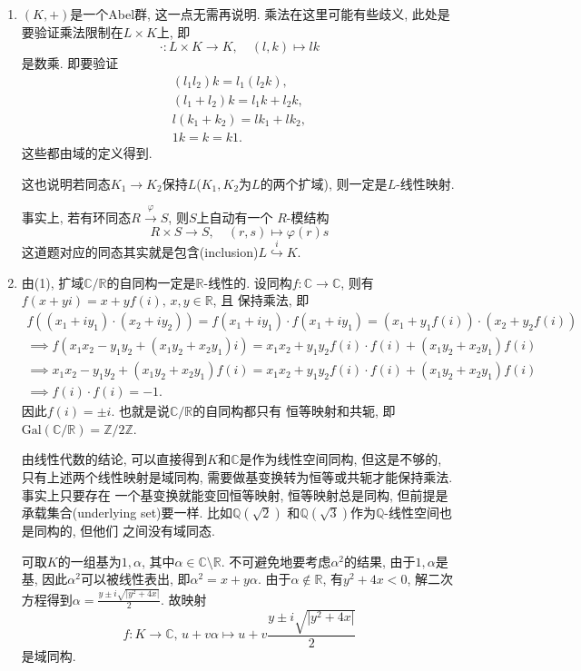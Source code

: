 \begin{solution}
\begin{enumerate}[(1)]
    \item $(K, +)$是一个Abel群, 这一点无需再说明. 乘法在这里可能有些歧义,
    此处是要验证乘法限制在$L \times K$上, 即
    \[
        \cdot: L \times K \to K, \quad (l, k) \mapsto lk
    \]
    是数乘. 即要验证
    \[
    \begin{gathered}
        (l_1l_2)k = l_1(l_2k),\\
        (l_1 + l_2)k = l_1k + l_2k,\\
        l(k_1 + k_2) = lk_1 + lk_2,\\
        1k = k = k1.
    \end{gathered}
    \]
    这些都由域的定义得到.

    这也说明若同态$K_1 \to K_2$保持$L$($K_1, K_2$为$L$的两个扩域),
    则一定是$L$-线性映射.

    事实上, 若有环同态$R \overset{\varphi}\to S$, 则$S$上自动有一个
    $R$-模结构
    \[
        R \times S \to S, \quad (r, s) \mapsto \varphi(r)s
    \]
    这道题对应的同态其实就是包含(inclusion)$L \overset{i}\hookrightarrow K$.
    \item 由(1), 扩域$\mathbb{C}/\mathbb{R}$的自同构一定是$\mathbb{R}$-线性的.
    设同构$f: \mathbb{C} \to \mathbb{C}$, 则有
    $f(x + yi) = x + yf(i),\, x, y \in \mathbb{R}$, 且
    保持乘法, 即
    \[
    \begin{gathered}
        f\left((x_1 + iy_1) \cdot (x_2 + iy_2)\right) = f(x_1 + iy_1) \cdot f(x_1 + iy_1) = (x_1 + y_1f(i)) \cdot (x_2 + y_2f(i))\\
        \implies f\left(x_1x_2 - y_1y_2 + (x_1y_2 +x_2y_1)i\right) = x_1x_2 + y_1y_2f(i) \cdot f(i) + (x_1y_2 +x_2y_1)f(i)\\
        \implies x_1x_2 - y_1y_2 + (x_1y_2 +x_2y_1)f(i) = x_1x_2 + y_1y_2f(i) \cdot f(i) + (x_1y_2 +x_2y_1)f(i)\\
        \implies f(i) \cdot f(i) = -1.
    \end{gathered}  
    \]
    因此$f(i) = \pm i$. 也就是说$\mathbb{C}/\mathbb{R}$的自同构都只有
    恒等映射和共轭, 即$\mathrm{Gal}(\mathbb{C}/\mathbb{R}) = \mathbb{Z}/2\mathbb{Z}$.

    由线性代数的结论, 可以直接得到$K$和$\mathbb{C}$是作为线性空间同构, 但这是不够的,
    只有上述两个线性映射是域同构, 需要做基变换转为恒等或共轭才能保持乘法. 事实上只要存在
    一个基变换就能变回恒等映射, 恒等映射总是同构,
    但前提是承载集合(underlying set)要一样. 比如$\mathbb{Q}(\sqrt{2})$
    和$\mathbb{Q}(\sqrt{3})$作为$\mathbb{Q}$-线性空间也是同构的, 但他们
    之间没有域同态.

    可取$K$的一组基为$1, \alpha$, 其中$\alpha \in \mathbb{C} \setminus \mathbb{R}$.
    不可避免地要考虑$\alpha^2$的结果, 由于$1, \alpha$是基, 因此$\alpha^2$可以被线性表出,
    即$\alpha^2 = x + y\alpha$. 由于$\alpha \notin \mathbb{R}$, 有$y^2 + 4x < 0$,
    解二次方程得到$\alpha = \frac{y \pm i\sqrt{|y^2 + 4x|}}{2}$.
    故映射
\[
    f: K \to \mathbb{C},\, u + v\alpha \mapsto u + v\frac{y \pm i\sqrt{|y^2 + 4x|}}{2}
\]
    是域同构.
\end{enumerate}
\end{solution}

